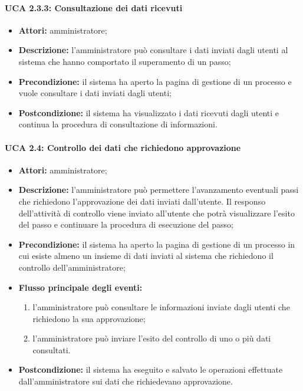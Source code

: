 \paragraph{UCA 2.3.3: Consultazione dei dati ricevuti}
\begin{itemize}
\item \textbf{Attori:} amministratore;
\item \textbf{Descrizione:} 
l'amministratore può consultare i dati inviati dagli utenti al sistema che hanno comportato il superamento di un passo;
\item \textbf{Precondizione:} 
il sistema ha aperto la pagina di gestione di un processo e vuole consultare i dati inviati dagli utenti;
\item \textbf{Postcondizione:} 
il sistema ha visualizzato i dati ricevuti dagli utenti e continua la procedura di consultazione di informazioni.
\end{itemize}

\paragraph{UCA 2.4: Controllo dei dati che richiedono approvazione}
\begin{itemize}
\item \textbf{Attori:} 
amministratore;
\item \textbf{Descrizione:} 
l'amministratore può permettere l'avanzamento eventuali passi che richiedono l'approvazione dei dati inviati dall'utente.
Il responso dell'attività di controllo viene inviato all'utente che potrà visualizzare l'esito del passo e continuare la procedura di esecuzione del passo;
\item \textbf{Precondizione:} 
il sistema ha aperto la pagina di gestione di un processo in cui esiste almeno un insieme di dati inviati al sistema che richiedono il controllo dell'amministratore;
\item \textbf{Flusso principale degli eventi:} 
\begin{enumerate}
\item l'amministratore può consultare le informazioni inviate dagli utenti che richiedono la sua approvazione;
\item l'amministratore può inviare l'esito del controllo di uno o più dati consultati.
\end{enumerate}
\item \textbf{Postcondizione:}
il sistema ha eseguito e salvato le operazioni effettuate dall'amministratore sui dati che richiedevano approvazione.
\end{itemize}

